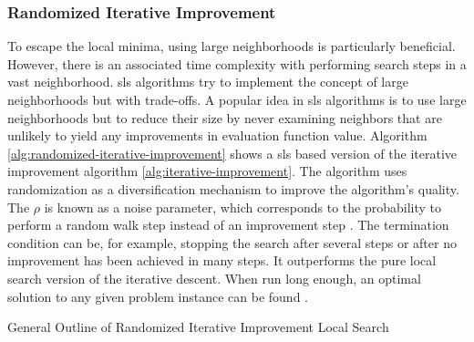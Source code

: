\subsubsection{Randomized Iterative Improvement}
To escape the local minima, using large neighborhoods is particularly beneficial. However, there is an associated time complexity with performing search steps in a vast neighborhood. \Gls{sls} algorithms try to implement the concept of large neighborhoods but with trade-offs. A popular idea in \gls{sls} algorithms is to use large neighborhoods but to reduce their size by never examining neighbors that are unlikely to yield any improvements in evaluation function value. 
Algorithm \ref{alg:randomized-iterative-improvement} shows a \gls{sls} based version of the iterative improvement algorithm \ref{alg:iterative-improvement}. The algorithm uses randomization as a diversification mechanism to improve the algorithm's quality. The $\rho$ is known as a noise parameter, which corresponds to the probability to perform a random walk step instead of an improvement step \parencite{HolgerH2013StochasticApplications}. The termination condition can be, for example, stopping the search after several steps or after no improvement has been achieved in many steps. It outperforms the pure local search version of the iterative descent. When run long enough, an optimal solution to any given problem instance can be found \parencite{HolgerH2013StochasticApplications}.

 \begin{algorithm}
  \caption{General Outline of Randomized Iterative Improvement Local Search}\label{alg:randomized-iterative-improvement}
  \end{algorithm}




